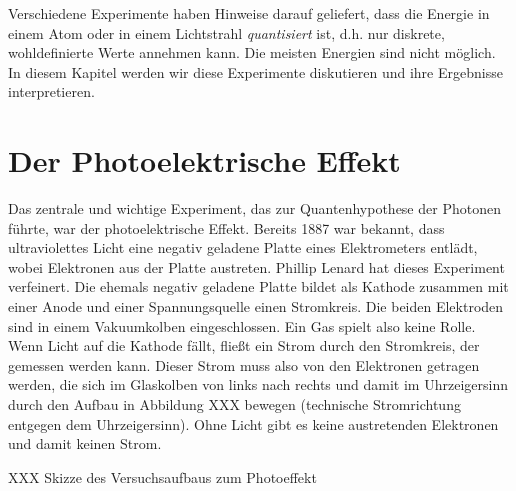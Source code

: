 Verschiedene Experimente haben Hinweise darauf geliefert, dass die Energie in einem Atom oder in einem Lichtstrahl \emph{quantisiert} ist, d.h. nur diskrete, wohldefinierte Werte annehmen kann. Die meisten Energien sind nicht möglich. In diesem Kapitel werden wir diese Experimente diskutieren und ihre Ergebnisse interpretieren.

\section{Der Photoelektrische Effekt}

Das zentrale und wichtige Experiment, das zur Quantenhypothese der Photonen führte, war der photoelektrische Effekt. Bereits 1887 war bekannt, dass ultraviolettes Licht eine negativ geladene Platte eines Elektrometers entlädt, wobei Elektronen aus der Platte austreten. Phillip Lenard hat dieses Experiment verfeinert. Die ehemals negativ geladene Platte bildet als Kathode zusammen mit einer Anode und einer Spannungsquelle einen Stromkreis. Die beiden Elektroden sind in einem Vakuumkolben eingeschlossen. Ein Gas spielt also keine Rolle. Wenn Licht auf die Kathode fällt, fließt ein Strom durch den Stromkreis, der gemessen werden kann. Dieser Strom muss also von den Elektronen getragen werden, die sich im Glaskolben von links nach rechts und damit im Uhrzeigersinn durch den Aufbau in Abbildung XXX bewegen
(technische Stromrichtung entgegen dem Uhrzeigersinn). Ohne Licht gibt es keine austretenden Elektronen und damit keinen Strom.

\begin{marginfigure}
 \caption{XXX Skizze des Versuchsaufbaus zum Photoeffekt}
\end{marginfigure}


